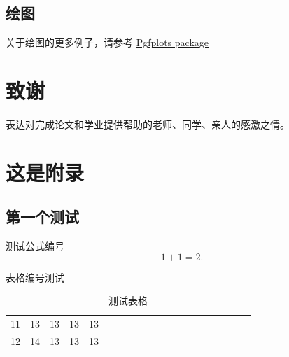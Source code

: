 \documentclass[]{WHUBachelor}
\begin{document}
  
  \section{绘图}
  关于绘图的更多例子，请参考 \href{https://www.overleaf.com/learn/latex/Pgfplots_package}{Pgfplots package}


  

  \chapter*{致谢}
  表达对完成论文和学业提供帮助的老师、同学、亲人的感激之情。


  \appendix

  \chapter{这是附录}

  \section{第一个测试}
  测试公式编号
  \begin{equation}
    1+1=2.
  \end{equation}

  表格编号测试

  \begin{table}[h]
    \centering
    \caption{测试表格}
    \begin{tabular}{*{20}c}
      \hline
      11 & 13  & 13  & 13  & 13 \\
      12 & 14  & 13  & 13  & 13 \\
      \hline
    \end{tabular}
  \end{table}
\end{document}
